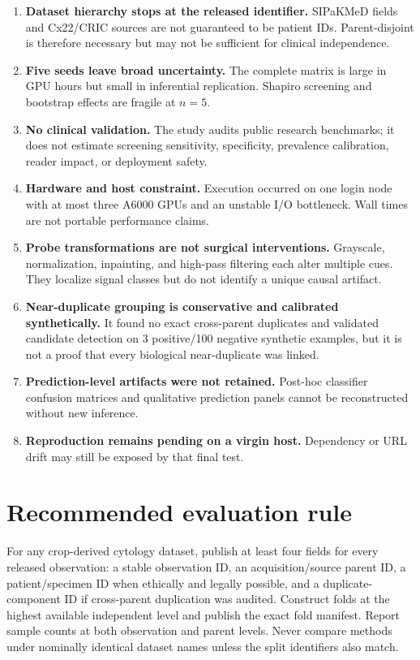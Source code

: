 \documentclass[11pt,oneside]{report}
\begin{document}
\begin{enumerate}[leftmargin=2em]
  \item \textbf{Dataset hierarchy stops at the released identifier.} SIPaKMeD fields and Cx22/CRIC sources are not guaranteed to be patient IDs. Parent-disjoint is therefore necessary but may not be sufficient for clinical independence.
  \item \textbf{Five seeds leave broad uncertainty.} The complete matrix is large in GPU hours but small in inferential replication. Shapiro screening and bootstrap effects are fragile at $n=5$.
  \item \textbf{No clinical validation.} The study audits public research benchmarks; it does not estimate screening sensitivity, specificity, prevalence calibration, reader impact, or deployment safety.
  \item \textbf{Hardware and host constraint.} Execution occurred on one login node with at most three A6000 GPUs and an unstable I/O bottleneck. Wall times are not portable performance claims.
  \item \textbf{Probe transformations are not surgical interventions.} Grayscale, normalization, inpainting, and high-pass filtering each alter multiple cues. They localize signal classes but do not identify a unique causal artifact.
  \item \textbf{Near-duplicate grouping is conservative and calibrated synthetically.} It found no exact cross-parent duplicates and validated candidate detection on 3 positive/100 negative synthetic examples, but it is not a proof that every biological near-duplicate was linked.
  \item \textbf{Prediction-level artifacts were not retained.} Post-hoc classifier confusion matrices and qualitative prediction panels cannot be reconstructed without new inference.
  \item \textbf{Reproduction remains pending on a virgin host.} Dependency or URL drift may still be exposed by that final test.
\end{enumerate}

\section{Recommended evaluation rule}

For any crop-derived cytology dataset, publish at least four fields for every released observation: a stable observation ID, an acquisition/source parent ID, a patient/specimen ID when ethically and legally possible, and a duplicate-component ID if cross-parent duplication was audited. Construct folds at the highest available independent level and publish the exact fold manifest. Report sample counts at both observation and parent levels. Never compare methods under nominally identical dataset names unless the split identifiers also match.
\end{document}
